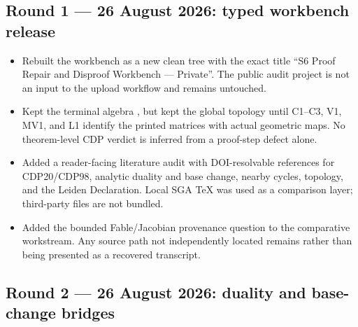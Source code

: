 \subsection*{Round 1 --- 26 August 2026: typed workbench release}

\begin{itemize}[leftmargin=1.8em]
\item Rebuilt the workbench as a new clean tree with the exact title
``S6 Proof Repair and Disproof Workbench --- Private''.  The public audit
project is not an input to the upload workflow and remains untouched.
\item Kept the terminal algebra \Verified{}, but kept the global topology
\Conditional{} until C1--C3, V1, MV1, and L1 identify the printed matrices with
actual geometric maps.  No theorem-level CDP verdict is inferred from a
proof-step defect alone.
\item Added a reader-facing literature audit with DOI-resolvable references
for CDP20/CDP98, analytic duality and base change, nearby cycles, topology,
and the Leiden Declaration.  Local SGA TeX was used as a comparison layer;
third-party files are not bundled.
\item Added the bounded Fable/Jacobian provenance question to the
comparative workstream.  Any source path not independently located remains
\Open{} rather than being presented as a recovered transcript.
\end{itemize}

\subsection*{Round 2 --- 26 August 2026: duality and base-change bridges}

